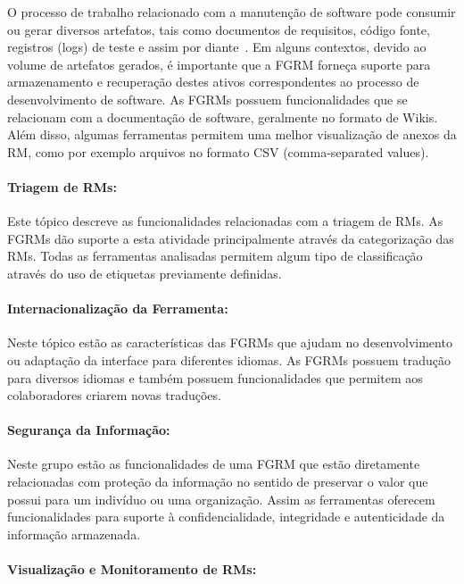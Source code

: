 O processo de trabalho relacionado com a manutenção de software pode consumir
ou gerar diversos artefatos, tais como documentos de requisitos, código fonte,
registros (logs) de teste e assim por diante~\cite{cavalcanti2013bug}. Em
alguns contextos, devido ao volume de artefatos gerados, é importante que a
FGRM forneça suporte para armazenamento e recuperação destes ativos
correspondentes ao processo de desenvolvimento de software. As FGRMs possuem
funcionalidades que se relacionam com a documentação de software,
geralmente no formato de Wikis. Além disso, algumas ferramentas permitem uma
melhor visualização de anexos da RM, como por exemplo arquivos no formato CSV
(comma-separated values).

\paragraph{Triagem de RMs:}
\label{par:triagem_de_rm_s}

Este tópico descreve as funcionalidades relacionadas com a triagem de RMs. As
FGRMs dão suporte a esta atividade principalmente através da categorização das
RMs. Todas as ferramentas analisadas permitem algum tipo de classificação
através do uso de etiquetas previamente definidas.

\paragraph{Internacionalização da Ferramenta:}
\label{par:internacionalização_da_ferramenta}

Neste tópico estão as características das FGRMs que ajudam no desenvolvimento
ou adaptação da interface para diferentes idiomas. As FGRMs possuem tradução
para diversos idiomas e também possuem funcionalidades que permitem aos
colaboradores criarem novas traduções.

\paragraph{Segurança da Informação:}
\label{par:segurança_da_informação}

Neste grupo estão as funcionalidades de uma FGRM que estão diretamente
relacionadas com proteção da informação no sentido de preservar o valor que
possui para um indivíduo ou uma organização. Assim as ferramentas oferecem
funcionalidades para suporte à confidencialidade, integridade e autenticidade
da informação armazenada.

\paragraph{Visualização e Monitoramento de RMs:}
\label{par:visualização_de_rm_s}

